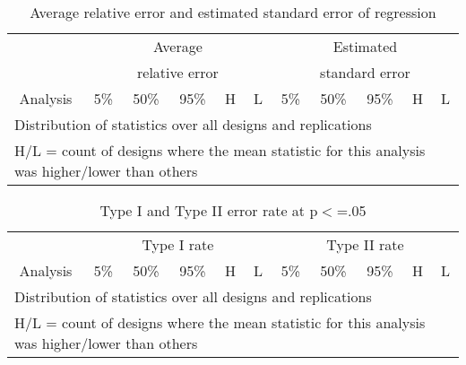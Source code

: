 \documentclass[10pt]{report}
\begin{document}
\begin{table}[ht]
\begin{center}
\caption{Average relative error and estimated standard error of regression}
\begin{tabular}{lrrrrrrrrrr}
\toprule
&\multicolumn{5}{c}{Average}&\multicolumn{5}{c}{Estimated} \\
&\multicolumn{5}{c}{relative error}&\multicolumn{5}{c}{standard error} \\
\cmidrule(l{.75em}){2-6}\cmidrule(l{.75em}){7-11}
\multicolumn{1}{c}{Analysis}&\multicolumn{1}{c}{5\%}&\multicolumn{1}{c}{50\%}&\multicolumn{1}{c}{95\%}&\multicolumn{1}{c}{H}&\multicolumn{1}{c}{L}&\multicolumn{1}{c}{5\%}&\multicolumn{1}{c}{50\%}&\multicolumn{1}{c}{95\%}&\multicolumn{1}{c}{H}&\multicolumn{1}{c}{L} \\
\midrule

\bottomrule
\multicolumn{11}{l}{\footnotesize{Distribution of statistics over all designs and replications}} \\
\multicolumn{11}{l}{\footnotesize{H/L = count of designs where the mean statistic for this analysis was higher/lower than others}} \\
\end{tabular}
\end{center}
\end{table}

\begin{table}[ht]
\begin{center}
\caption{Type I and Type II error rate at p$<$=.05}
\begin{tabular}{lrrrrrrrrrr}
\toprule
&\multicolumn{5}{c}{Type I rate}&\multicolumn{5}{c}{Type II rate} \\
\cmidrule(l{.75em}){2-6}\cmidrule(l{.75em}){7-11}
\multicolumn{1}{c}{Analysis}&\multicolumn{1}{c}{5\%}&\multicolumn{1}{c}{50\%}&\multicolumn{1}{c}{95\%}&\multicolumn{1}{c}{H}&\multicolumn{1}{c}{L}&\multicolumn{1}{c}{5\%}&\multicolumn{1}{c}{50\%}&\multicolumn{1}{c}{95\%}&\multicolumn{1}{c}{H}&\multicolumn{1}{c}{L} \\
\midrule

\bottomrule
\multicolumn{11}{l}{\footnotesize{Distribution of statistics over all designs and replications}} \\
\multicolumn{11}{l}{\footnotesize{H/L = count of designs where the mean statistic for this analysis was higher/lower than others}} \\
\end{tabular}
\end{center}
\end{table}
\end{document}
